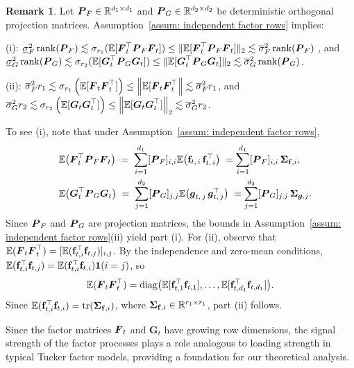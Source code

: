 \documentclass[11pt,letterpaper]{article}
\newcommand{\bfm}[1]{\ensuremath{\boldsymbol{#1}}} %
\def\bg{\bfm g}   \def\bG{\bfm G}  \def\GG{\mathbb{G}}
\DeclareMathOperator{\rank}{rank}
\theoremstyle{definition}
\newtheorem{remark}{Remark}
\newcommand{\bfv}{\mathbf{f}}
\begin{document}
 

\begin{remark}\label{remark:signal_strength}
Let $\bP_{F} \in \RR^{d_1 \times d_1}$ and $\bP_{G} \in \RR^{d_2 \times d_2}$ be deterministic orthogonal projection matrices. Assumption~\ref{assum: independent factor rows} implies:

\noindent (i): $\underline{\sigma}_{ F}^2 \rank(\bP_{F}) \lesssim \sigma_{r_1}(\EE[\bF_t^\top \bP_{F} \bF_t]) \le \|\EE[\bF_t^\top \bP_{F} \bF_t]\|_2 \lesssim \overline{\sigma}_{F}^2 \rank(\bP_{F})\;$, and $\underline{\sigma}_{G}^2 \rank(\bP_{G}) \lesssim \sigma_{r_2}(\EE[\bG_t^\top \bP_{G} \bG_t]) \le \|\EE[\bG_t^\top \bP_{G} \bG_t]\|_2 \lesssim \overline{\sigma}_{G}^2 \rank(\bP_{G})$.

\noindent (ii): $\overline{\sigma}_{F}^2 r_1 \lesssim \sigma_{r_1}\left(\EE[\bF_t \bF_t^\top]\right) \le \left\|\EE[\bF_t \bF_t^\top\right\| \lesssim \overline{\sigma}_{F}^2 r_1$, and $\overline{\sigma}_{G}^2 r_2 \lesssim \sigma_{r_2}\left(\EE[\bG_t \bG_t^\top]\right) \le \left\|\EE[\bG_t \bG_t^\top]\right\|_2 \lesssim \overline{\sigma}_{G}^2 r_2 $.

To see (i), note that under Assumption~\ref{assum: independent factor rows},
\begin{equation*}
\begin{split}
& \EE\bigl(\bF_t^{\top}\bP_{F}\bF_t\bigr)
\;=\;\sum_{i=1}^{d_1}[\bP_{F}]_{i, i}\EE\bigl(\bfv_{t,\,i}\,\bfv_{t,\,i}^{\top}\bigr)
\;=\sum_{i=1}^{d_1}[\bP_{F}]_{i, i}\,\bSigma_{\bfv, i}, \\
\quad
& \EE\bigl(\bG_t^{\top}\bP_{G}\bG_t\bigr)
\;=\;\sum_{j=1}^{d_2}[\bP_{G}]_{j, j}\EE\bigl(\bg_{t,\,j}\,\bg_{t,\,j}^{\top}\bigr)
\;=\sum_{j=1}^{d_2}[\bP_{G}]_{j, j}\,\bSigma_{\bg, j}.
\end{split}
\end{equation*}
Since $\bP_{F}$ and $\bP_{G}$ are projection matrices, the bounds in Assumption~\ref{assum: independent factor rows}(ii) yield part (i).
For (ii), observe that $\EE(\bF_t\bF_t^{\top}) = [\EE(\bfv_{t, i}^\top \bfv_{t, j})]_{i, j}$.
By the independence and zero-mean conditions, \(\EE(\bfv_{t, i}^\top \bfv_{t, j}) = \EE(\bfv_{t, i}^\top \bfv_{t, i})\mathbf{1}(i =j)\), so
\[
\EE(\bF_t\bF_t^{\top}) 
= 
\operatorname{diag}\!\big(\EE[\bfv_{t, 1}^\top \bfv_{t, 1}], \dots, \EE[\bfv_{t, d_1}^\top \bfv_{t, d_1}]\big).
\]
Since $\EE(\bfv_{t, i}^{\top}\bfv_{t, i})= \operatorname{tr}(\bSigma_{\bfv, i})$, where $\bSigma_{\bfv, i} \in \RR^{r_1 \times r_1}$, part (ii) follows.


Since the factor matrices $\bF_t$ and $\bG_t$ have growing row dimensions, the signal strength of the factor processes plays a role analogous to loading strength in typical Tucker factor models, providing a foundation for our theoretical analysis.
\end{remark}
\end{document}
